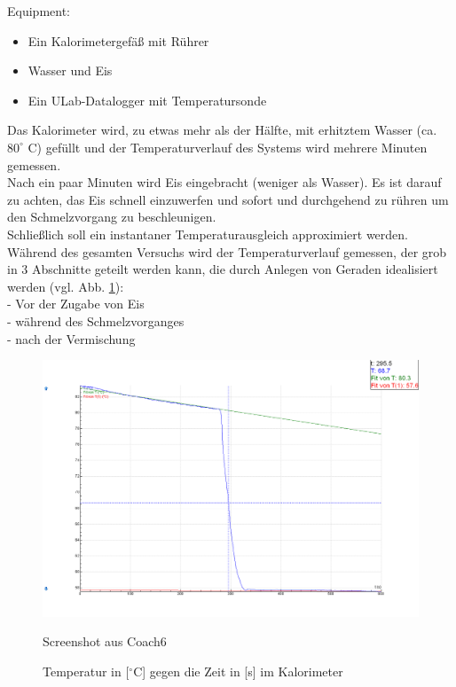 \documentclass[12pt,a4paper]{article}
\begin{document}
\begin{multicols}{2}

\noindent Equipment:
\begin {itemize}
	\item Ein Kalorimetergefäß mit Rührer
	\item Wasser und Eis
	\item Ein ULab-Datalogger mit Temperatursonde
\end {itemize}

Das Kalorimeter wird, zu etwas mehr als der Hälfte, mit erhitztem Wasser (ca. $80^{\circ}$ C) gefüllt und der Temperaturverlauf des Systems wird mehrere Minuten gemessen.\\
Nach ein paar Minuten wird Eis eingebracht (weniger als Wasser). Es ist darauf zu achten, das Eis schnell einzuwerfen und sofort und durchgehend zu rühren um den Schmelzvorgang zu beschleunigen.\\
Schließlich soll ein instantaner Temperaturausgleich approximiert werden.\\
Während des gesamten Versuchs wird der Temperaturverlauf gemessen, der grob in 3 Abschnitte geteilt werden kann, die durch Anlegen von Geraden idealisiert werden (vgl. Abb. \ref{fig:Tempverlauf-Eis}):\\
- Vor der Zugabe von Eis\\
- während des Schmelzvorganges\\
- nach der Vermischung


\end{multicols}

\begin{figure}[H]
	\centering
	\includegraphics[scale=0.35]{./figure/PW4_graph.PNG}
	\caption{Temperatur in [$^\circ$C] gegen die Zeit in [s] im Kalorimeter\ }
	{\centering Screenshot aus Coach6}
	\label{fig:Tempverlauf-Eis}
\end{figure}
\noindent
\end{document}
